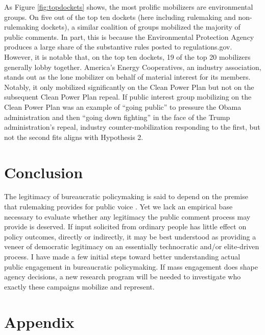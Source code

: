 \documentclass[
      12pt,
        ]{article}
\begin{document}
As Figure \ref{fig:topdockets} shows, the most prolific mobilizers are
environmental groups. On five out of the top ten dockets (here including
rulemaking and non-rulemaking dockets), a similar coalition of groups
mobilized the majority of public comments. In part, this is because the
Environmental Protection Agency produces a large share of the
substantive rules posted to regulations.gov. However, it is notable
that, on the top ten dockets, 19 of the top 20 mobilizers generally
lobby together. America's Energy Cooperatives, an industry association,
stands out as the lone mobilizer on behalf of material interest for its
members. Notably, it only mobilized significantly on the Clean Power
Plan but not on the subsequent Clean Power Plan repeal. If public
interest group mobilizing on the Clean Power Plan was an example of
``going public'' to pressure the Obama administration and then ``going
down fighting'' in the face of the Trump administration's repeal,
industry counter-mobilization responding to the first, but not the
second fits aligns with Hypothesis 2.

\hypertarget{conclusion}{%
\section{Conclusion}\label{conclusion}}

The legitimacy of bureaucratic policymaking is said to depend on the premise that rulemaking provides for public voice \citep[\citet{Rosenbloom2003}]{Croley2003}. Yet we lack an empirical base necessary to evaluate whether any legitimacy the public comment process may provide is deserved. If input solicited from ordinary people has little effect on policy outcomes, directly or indirectly, it may be best understood as providing a veneer of democratic legitimacy on an essentially technocratic and/or elite-driven process. I have made a few initial steps toward better understanding actual public engagement in bureaucratic policymaking.
If mass engagement does shape agency decisions, a new research program will be needed to investigate who exactly these campaigns mobilize and represent.

\newpage

\hypertarget{appendix-appendix}{%
\appendix}


\hypertarget{appendix}{%
\section*{Appendix}\label{appendix}}
\end{document}

